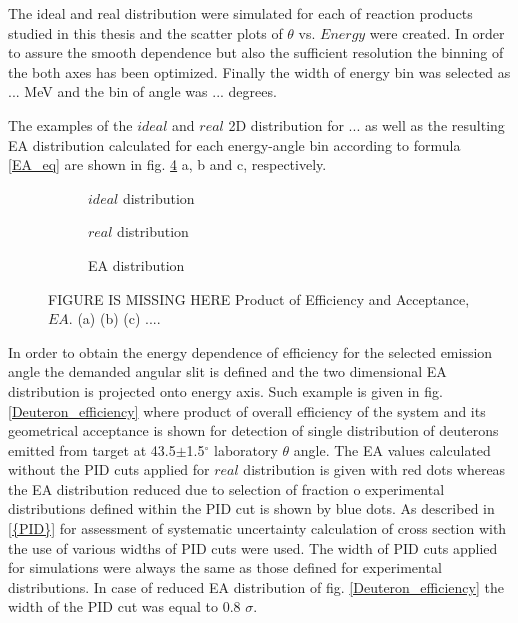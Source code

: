 The ideal and real distribution were simulated for each of reaction products studied in this thesis and the scatter plots of $\theta$ vs. $Energy$ were created. In order to assure the smooth dependence but also the sufficient resolution the binning of the both axes 
has been optimized. Finally the width of energy bin was selected as 
... MeV and the bin of angle was ... degrees.

The examples of the $ideal$ and $real$ 2D distribution for ... 
as well as the resulting EA distribution calculated for each energy-angle bin according to formula \ref{EA_eq} are shown 
in fig. \ref{EA_INCL} a, b and c, respectively.

    \begin{figure}
    \centering
	\begin{subfigure}[a]{0.45\textwidth}
		\caption{\label{EAideal1} $ideal$ distribution }
	\end{subfigure}
	\begin{subfigure}[b]{0.45\textwidth}
		\caption{\label{EAreal2} $real$ distribution}
		\end{subfigure}
	\begin{subfigure}[c]{0.45\textwidth}
		\caption{\label{EAreal3} EA distribution}
		\end{subfigure}		
	\caption{\label{EA_INCL} FIGURE IS MISSING HERE 
	Product of Efficiency and Acceptance,  $EA$. 
	(a) (b) (c) .... 
	    }
\end{figure}

In order to obtain the energy dependence of efficiency 
for the selected emission angle the demanded angular 
slit is defined and the two dimensional EA distribution 
is projected onto energy axis. Such example is given in fig. \ref{Deuteron_efficiency} where 
product of overall efficiency of the system and its geometrical acceptance is shown for detection of single distribution of deuterons emitted from target at 43.5$\pm$1.5$^{\circ}$ laboratory $\theta$ angle. The EA values calculated without the PID cuts applied for $real$ distribution is given with red dots whereas the 
EA distribution reduced due to selection of fraction o experimental distributions defined within the PID cut is shown by blue dots. As described in \ref{{PID}} for assessment of systematic uncertainty calculation of cross section with the use of various widths of PID cuts were used. The width of PID cuts applied for simulations 
were always the same as those defined for experimental distributions. In case of reduced EA distribution 
of fig. \ref{Deuteron_efficiency} the width of the PID cut was equal to 0.8 $\sigma$.

